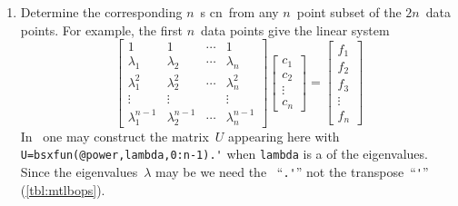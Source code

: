 \begin{procedure}
\begin{enumerate}
\item\label{pro:eic} Determine the corresponding \(n\)~s \hlist cn\ from any \(n\)~point subset of the \(2n\)~data points.
For example, the first \(n\)~data points give the linear system 
\begin{equation*}
\begin{bmatrix} 1&1&\cdots&1
\\\lambda_1&\lambda_2&\cdots&\lambda_n
\\\lambda_1^2&\lambda_2^2&\cdots&\lambda_n^2
\\\vdots&\vdots&&\vdots
\\\lambda_1^{n-1}&\lambda_2^{n-1}&\cdots&\lambda_n^{n-1}
 \end{bmatrix}\begin{bmatrix} c_1\\c_2\\\vdots\\c_n \end{bmatrix}
 =\begin{bmatrix} f_1\\f_2\\f_3\\\vdots\\f_n \end{bmatrix}
\end{equation*}
In \script\ one may construct the matrix~\(U\) appearing here with \verb|U=bsxfun(@power,lambda,0:n-1).'| when \verb|lambda| is a  of the eigenvalues.
Since the eigenvalues~\(\lambda\) may be  we need the ~``\verb|.'|'' not the  transpose~``\verb|'|'' (\autoref{tbl:mtlbops}).
\end{enumerate}
\end{procedure}





